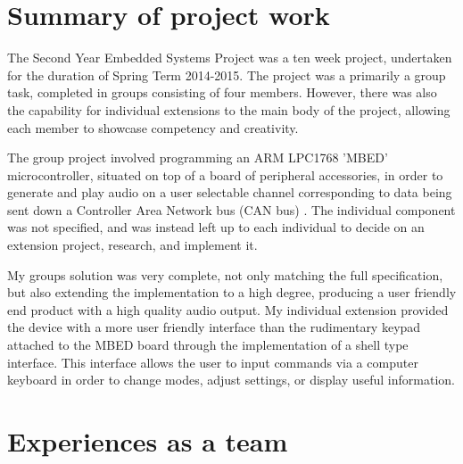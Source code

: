 \section{Summary of project work}

The Second Year Embedded Systems Project was a ten week project, undertaken 
for the duration of Spring Term 2014-2015. 
The project was a primarily a group task, completed in groups consisting of four 
members. 
However, there was also the capability for individual extensions to the main 
body of the project, allowing each member to showcase competency and creativity.
\par\bigskip\noindent
The group project involved programming an ARM LPC1768 'MBED' microcontroller, 
situated on top of a board of peripheral accessories, in order to 
generate and play audio on a user selectable channel corresponding to data 
being sent down a Controller Area Network bus (CAN bus) \cite{can-wiki}.
The individual component was not specified, and was instead left up to each 
individual to decide on an extension project, research, and implement it. 
\par\bigskip\noindent
My groups solution was very complete, not only matching the full specification, 
but also extending the implementation to a high degree, producing a user 
friendly end product with a high quality audio output. 
My individual extension provided the device with a more user friendly 
interface than the rudimentary keypad attached to the MBED board through the 
implementation of a shell type interface. 
This interface allows the user to input commands via a computer keyboard in 
order to change modes, adjust settings, or display useful information.

 
\section{Experiences as a team}

